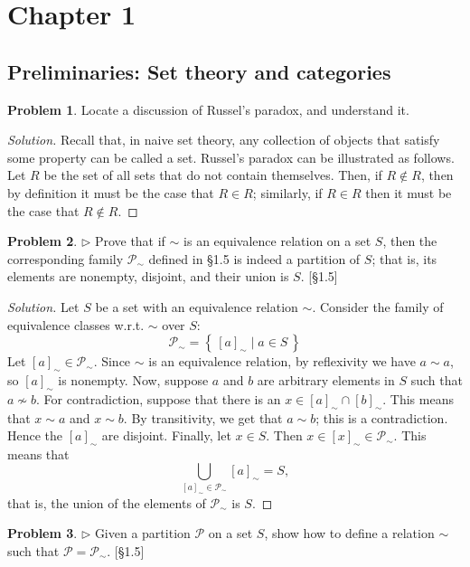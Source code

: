 \documentclass[fontsize=14pt]{scrartcl}
\theoremstyle{definition}
\newtheorem{problem-internal}{Problem}[subsection]
\newenvironment{problem}{
  \medskip
  \begin{problem-internal}
}{
  \end{problem-internal}
}
\newenvironment{solution}{
  \begin{proof}[Solution]
  \vspace{-8px}
  \setlength{\parskip}{4px}
  \setlength{\parindent}{0px}
}{
  \end{proof}
}
\newcommand{\set}[1]{\left\{\,#1\,\right\}}
\begin{document}
\section{Chapter 1}
\subsection{Preliminaries: Set theory and categories}


\begin{problem}
Locate a discussion of Russel's paradox, and understand it.
\end{problem}
\begin{solution}
Recall that, in naive set theory, any collection of objects
that satisfy some property can be called a set. Russel's paradox can be
illustrated as follows.  Let $R$ be the set of all sets that do not contain
themselves. Then, if $R\notin R$, then by definition it must be the case that
$R\in R$; similarly, if $R\in R$ then it must be the case that $R\notin R$.
\end{solution}


\begin{problem}
$\rhd$ Prove that if $\sim$ is an equivalence relation on a set $S$, then
the corresponding family $\mathscr{P}_{\sim}$ defined in \S1.5 is indeed a
partition of $S$; that is, its elements are nonempty, disjoint, and their union
is $S$. [\S1.5]
\end{problem}

\begin{solution}
Let $S$ be a set with an equivalence relation $\sim$.
Consider the family of equivalence classes w.r.t. $\sim$ over $S$:
%
\[ \mathscr{P}_{\sim} = \set{[a]_{\sim} \mid a\in S} \]
%
Let $[a]_{\sim}\in\mathscr{P}_{\sim}$. Since $\sim$ is an equivalence relation,
by reflexivity we have $a\sim a$, so $[a]_{\sim}$ is nonempty. Now, suppose
$a$ and $b$ are arbitrary elements in $S$ such that $a\not\sim b$. For
contradiction, suppose that there is an $x\in [a]_{\sim}\cap[b]_{\sim}$. This
means that $x\sim a$ and $x\sim b$. By transitivity, we get that $a\sim b$; this
is a contradiction. Hence the $[a]_{\sim}$ are disjoint. Finally, let $x\in S$.
Then $x\in[x]_{\sim}\in \mathscr{P}_{\sim}$. This means that
%
\[ \bigcup_{[a]_{\sim} \in \mathscr{P}_{\sim}} [a]_{\sim} = S, \]
%
that is, the union of the elements of $\mathscr{P}_{\sim}$ is $S$.
\end{solution}


\begin{problem}
$\rhd$ Given a partition $\mathscr{P}$ on a set $S$, show how to define a
relation $\sim$ such that $\mathscr{P} = \mathscr{P}_{\sim}$. [\S1.5]
\end{problem}
\end{document}
